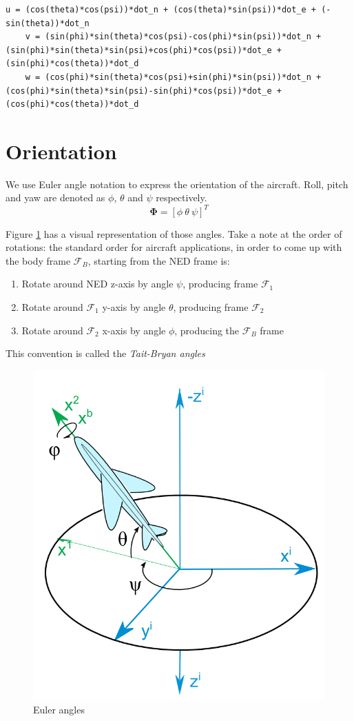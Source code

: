\begin{lstlisting}[style=C-style]
	u = (cos(theta)*cos(psi))*dot_n + (cos(theta)*sin(psi))*dot_e + (-sin(theta))*dot_n
	v = (sin(phi)*sin(theta)*cos(psi)-cos(phi)*sin(psi))*dot_n + (sin(phi)*sin(theta)*sin(psi)+cos(phi)*cos(psi))*dot_e + (sin(phi)*cos(theta))*dot_d
	w = (cos(phi)*sin(theta)*cos(psi)+sin(phi)*sin(psi))*dot_n + (cos(phi)*sin(theta)*sin(psi)-sin(phi)*cos(psi))*dot_e + (cos(phi)*cos(theta))*dot_d
\end{lstlisting}

\section{Orientation}

We use Euler angle notation to express the orientation of the aircraft. Roll, pitch and yaw are denoted as $\phi$, $\theta$ and $\psi$ respectively.
\begin{equation}
	\bm{\Phi} = [\phi \ \theta \ \psi]^T
\end{equation}

Figure \ref{fig:Euler_Anlges_2} has a visual representation of those angles. Take a note at the order of rotations: the standard order for aircraft applications, in order to come up with the body frame $\mathcal{F}_B$, starting from the NED frame is:
\begin{enumerate}
\item Rotate around NED z-axis by angle $\psi$, producing frame $\mathcal{F}_1$
\item Rotate around $\mathcal{F}_1$ y-axis by angle $\theta$, producing frame  $\mathcal{F}_2$
\item Rotate around  $\mathcal{F}_2$ x-axis by angle $\phi$, producing the $\mathcal{F}_B$ frame
\end{enumerate}
This convention is called the \emph{Tait-Bryan angles} \cite{Berner2008}

\begin{figure}[H]
\centering
\includegraphics[width=0.35\linewidth]{figures/Euler_Anlges_2}
\caption{Euler angles}
\label{fig:Euler_Anlges_2}
\end{figure}


